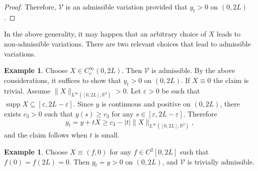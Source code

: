 \documentclass[11pt]{amsart}
\renewcommand{\leq}{\leqslant}
\renewcommand{\geq}{\geqslant}
\newcommand{\rr}{{\mathbb{R}}}
\newcommand{\eps}{\varepsilon}
\DeclareMathOperator{\supp}{supp}
\theoremstyle{definition}
\newtheorem{example}[theorem]{Example}
\theoremstyle{remark}
\numberwithin{equation}{section}
\begin{document}
\begin{proof}
		Therefore, $\mathcal V$ is an admissible variation provided that $y_t>0$ on $(0,2L)$.
	\end{proof}
	
	In the above generality, it may happen that an arbitrary choice of $X$ leads to non-admissible variations. There are two relevant choices that lead to admissible variations.
	\begin{example}\label{comptsuppareadmissible}
		Choose $X\in C^\infty_c(0,2L)$. Then $\mathcal V$ is admissible. By the above considerations, it suffices to show that $y_t> 0$ on $(0,2L)$. If $X\equiv 0$ the claim is trivial. Assume $\|X\|_{L^\infty([0,2L],\rr^2)}>0$. Let $\eps>0$ be such that $\supp X\subseteq[\eps,2L-\eps]$. Since $y$ is continuous and positive on  $(0,2L)$, there exists $c_3>0$ such that $y(s)\geq c_3$ for any $s\in [\eps,2L-\eps]$. Therefore
		\begin{equation*}
			y_t=y+tX\geq c_3-|t|\|X\|_{L^\infty([0,2L],\rr^2)},
		\end{equation*}
		and the claim follows when $t$ is small.
	\end{example}
	\begin{example}\label{verticalvar}
		Choose $X\equiv(f,0)$ for any $f\in C^2[0,2L]$ such that $f(0)=f(2L)=0$. Then $y_t=y>0$ on $(0,2L)$, and $\mathcal V$ is trivially admissible. 
	\end{example}
\end{document}
